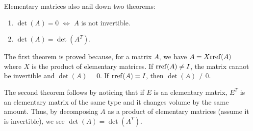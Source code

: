 \documentclass{workbook}
\begin{document}
\begin{lesson}
	Elementary matrices also nail down two theorems:
	\begin{enumerate}
		\item[(1)] $\det(A) = 0$ $\iff$ $A$ is not invertible.
		\item[(2)] $\det(A)=\det(A^T)$.
	\end{enumerate}

	The first theorem is proved because, for a matrix $A$, we have $A=X\!\operatorname{rref}(A)$ where $X$ is the product of elementary matrices.
	If $\operatorname{rref}(A)\neq I$, the matrix cannot be invertible and $\det(A)=0$. If $\operatorname{rref}(A)=I$, then $\det(A)\neq 0$.

	The second theorem follows by noticing that if $E$ is an elementary matrix, $E^T$ is an elementary matrix
	of the same type and it changes volume by the same amount. Thus, by decomposing $A$ as a product of elementary
	matrices (assume it is invertible), we see $\det(A)=\det(A^T)$.

\end{lesson}
\end{document}
